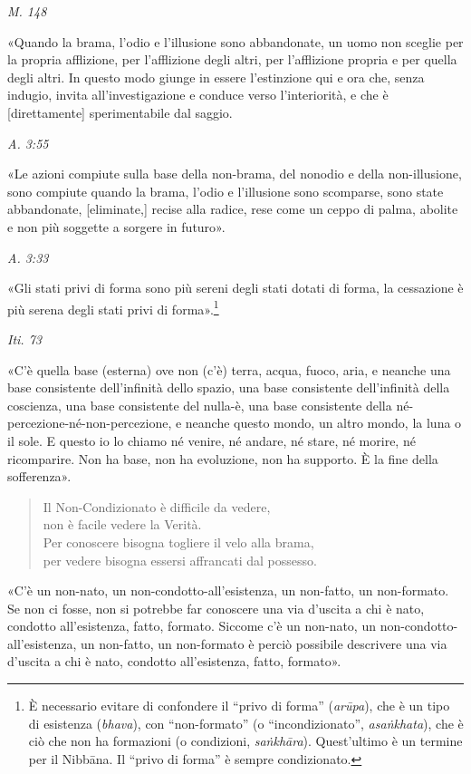 \emph{M. 148}


«Quando la brama, l’odio e l’illusione sono abbandonate, un uomo non
sceglie per la propria afflizione, per l’afflizione degli altri, per
l’afflizione propria e per quella degli altri. In questo modo giunge in
essere l’estinzione qui e ora che, senza indugio, invita
all’investigazione e conduce verso l’interiorità, e che è [direttamente]
sperimentabile dal saggio.


\emph{A. 3:55}


«Le azioni compiute sulla base della non-brama, del nonodio e della
non-illusione, sono compiute quando la brama, l’odio e l’illusione sono
scomparse, sono state abbandonate, [eliminate,] recise alla radice, rese
come un ceppo di palma, abolite e non più soggette a sorgere in futuro».


\emph{A. 3:33}


«Gli stati privi di forma sono più sereni degli stati dotati di forma,
la cessazione è più serena degli stati privi di
forma».\footnote{È necessario evitare di confondere il “privo di forma” (\emph{arūpa}), che è un tipo di esistenza (\emph{bhava}), con “non-formato” (o “incondizionato”, \emph{asaṅkhata}), che è ciò che non ha formazioni (o condizioni, \emph{saṅkhāra}). Quest’ultimo è un termine per il Nibbāna. Il “privo di forma” è sempre condizionato.}


\emph{Iti. 73}


«C’è quella base (esterna) ove non (c’è) terra, acqua, fuoco, aria, e
neanche una base consistente dell’infinità dello spazio, una base
consistente dell’infinità della coscienza, una base consistente del
nulla-è, una base consistente della né-percezione-né-non-percezione, e
neanche questo mondo, un altro mondo, la luna o il sole. E questo io lo
chiamo né venire, né andare, né stare, né morire, né ricomparire. Non ha
base, non ha evoluzione, non ha supporto. È la fine della sofferenza».


\begin{quotation}
Il Non-Condizionato è difficile da vedere, \\
non è facile vedere la Verità. \\
Per conoscere bisogna togliere il velo alla brama, \\
per vedere bisogna essersi affrancati dal possesso.
\end{quotation}

«C’è un non-nato, un non-condotto-all’esistenza, un non-fatto, un
non-formato. Se non ci fosse, non si potrebbe far conoscere una via
d’uscita a chi è nato, condotto all’esistenza, fatto, formato. Siccome
c’è un non-nato, un non-condotto-all’esistenza, un non-fatto, un
non-formato è perciò possibile descrivere una via d’uscita a chi è nato,
condotto all’esistenza, fatto, formato».


